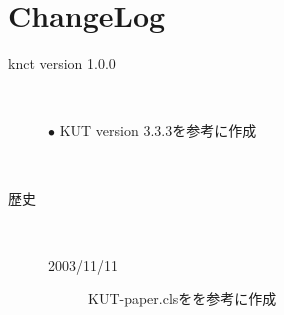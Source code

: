 \documentclass[mingoth]{knct-paper}		%
\begin{document}

\chapter{ChangeLog}

\begin{description}

 \item[knct version 1.0.0 ]~
 \begin{description}
  \item[$\bullet$ KUT version 3.3.3を参考に作成]~
 \end{description}

 \vspace{1zh}
 \item[歴史]~
 \begin{description}
  \item[2003/11/11] KUT-paper.clsをを参考に作成
 \end{description}
 
\end{description}
\end{document}
